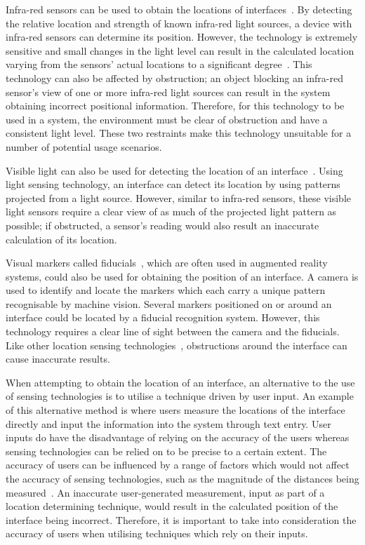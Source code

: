 \documentclass{bmcart}
\begin{document}
Infra-red sensors can be used to obtain the locations of interfaces~\cite{Kortuem2005}.
By detecting the relative location and strength of known infra-red light sources, a device with infra-red sensors can determine its position.
However, the technology is extremely sensitive and small changes in the light level can result in the calculated location varying from the sensors' actual locations to a significant degree~\cite{Kortuem2005}.
This technology can also be affected by obstruction; an object blocking an infra-red sensor's view of one or more infra-red light sources can result in the system obtaining incorrect positional information.
Therefore, for this technology to be used in a system, the environment must be clear of obstruction and have a consistent light level.
These two restraints make this technology unsuitable for a number of potential usage scenarios.

Visible light can also be used for detecting the location of an interface~\cite{Lee2004}.
Using light sensing technology, an interface can detect its location by using patterns projected from a light source.
However, similar to infra-red sensors, these visible light sensors require a clear view of as much of the projected light pattern as possible; if obstructed, a sensor's reading would also result an inaccurate calculation of its location.

Visual markers called fiducials~\cite{Bose1990}, which are often used in augmented reality systems, could also be used for obtaining the position of an interface.
A camera is used to identify and locate the markers which each carry a unique pattern recognisable by machine vision.
Several markers positioned on or around an interface could be located by a fiducial recognition system.
However, this technology requires a clear line of sight between the camera and the fiducials.
Like other location sensing technologies~\cite{Lee2004,Kortuem2005,Ni2004}, obstructions around the interface can cause inaccurate results.

When attempting to obtain the location of an interface, an alternative to the use of sensing technologies is to utilise a technique driven by user input.
An example of this alternative method is where users measure the locations of the interface directly and input the information into the system through text entry. 
User inputs do have the disadvantage of relying on the accuracy of the users whereas sensing technologies can be relied on to be precise to a certain extent.
The accuracy of users can be influenced by a range of factors which would not affect the accuracy of sensing technologies, such as the magnitude of the distances being measured~\cite{Al-Imam2006}.
An inaccurate user-generated measurement, input as part of a location determining technique, would result in the calculated position of the interface being incorrect.
Therefore, it is important to take into consideration the accuracy of users when utilising techniques which rely on their inputs.
\end{document}
